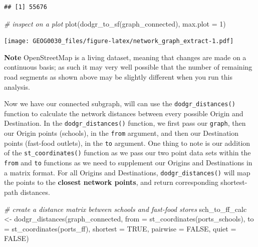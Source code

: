 \documentclass[
]{book}
\newenvironment{Shaded}{\begin{snugshade}}{\end{snugshade}}
\newcommand{\AttributeTok}[1]{\textcolor[rgb]{0.77,0.63,0.00}{#1}}
\newcommand{\CommentTok}[1]{\textcolor[rgb]{0.56,0.35,0.01}{\textit{#1}}}
\newcommand{\ConstantTok}[1]{\textcolor[rgb]{0.00,0.00,0.00}{#1}}
\newcommand{\DecValTok}[1]{\textcolor[rgb]{0.00,0.00,0.81}{#1}}
\newcommand{\FunctionTok}[1]{\textcolor[rgb]{0.00,0.00,0.00}{#1}}
\newcommand{\NormalTok}[1]{#1}
\newcommand{\OtherTok}[1]{\textcolor[rgb]{0.56,0.35,0.01}{#1}}
\begin{document}
\begin{verbatim}
## [1] 55676
\end{verbatim}

\begin{Shaded}
\begin{Highlighting}[]
\CommentTok{\# inspect on a plot}
\FunctionTok{plot}\NormalTok{(}\FunctionTok{dodgr\_to\_sf}\NormalTok{(graph\_connected), }\AttributeTok{max.plot =} \DecValTok{1}\NormalTok{)}
\end{Highlighting}
\end{Shaded}

\texttt{[image: GEOG0030\_files/figure-latex/network\_graph\_extract-1.pdf]}

\textbf{Note}
OpenStreetMap is a living dataset, meaning that changes are made on a continuous basis; as such it may very well possible that the number of remaining road segments as shown above may be slightly different when you run this analysis.

Now we have our connected subgraph, will can use the \texttt{dodgr\_distances()} function to calculate the network distances between every possible Origin and Destination. In the \texttt{dodgr\_distances()} function, we first pass our \texttt{graph}, then our Origin points (schools), in the \texttt{from} argument, and then our Destination points (fast-food outlets), in the \texttt{to} argument. One thing to note is our addition of the \texttt{st\_coordinates()} function as we pass our two point data sets within the \texttt{from} and \texttt{to} functions as we need to supplement our Origins and Destinations in a matrix format. For all Origins and Destinations, \texttt{dodgr\_distances()} will map the points to the \textbf{closest network points}, and return corresponding shortest-path distances.

\begin{Shaded}
\begin{Highlighting}[]
\CommentTok{\# create a distance matrix between schools and fast{-}food stores}
\NormalTok{sch\_to\_ff\_calc }\OtherTok{\textless{}{-}} \FunctionTok{dodgr\_distances}\NormalTok{(graph\_connected, }\AttributeTok{from =} \FunctionTok{st\_coordinates}\NormalTok{(ports\_schools),}
    \AttributeTok{to =} \FunctionTok{st\_coordinates}\NormalTok{(ports\_ff), }\AttributeTok{shortest =} \ConstantTok{TRUE}\NormalTok{, }\AttributeTok{pairwise =} \ConstantTok{FALSE}\NormalTok{, }\AttributeTok{quiet =} \ConstantTok{FALSE}\NormalTok{)}
\end{Highlighting}
\end{Shaded}
\end{document}
